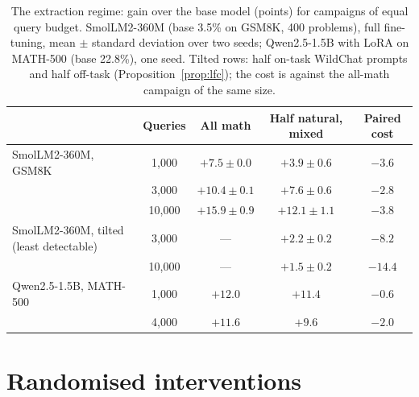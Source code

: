 \begin{table}[h]
\centering
\caption{The extraction regime: gain over the base model (points) for campaigns of equal query budget. SmolLM2-360M (base 3.5\% on GSM8K, 400 problems), full fine-tuning, mean $\pm$ standard deviation over two seeds; Qwen2.5-1.5B with LoRA on MATH-500 (base 22.8\%), one seed. Tilted rows: half on-task WildChat prompts and half off-task (Proposition~\ref{prop:lfc}); the cost is against the all-math campaign of the same size.}
\label{tabA:extract}
\small
\begin{tabular}{lcccc}
\toprule
& Queries & All math & Half natural, mixed & Paired cost \\
\midrule
SmolLM2-360M, GSM8K & 1{,}000 & $+7.5\pm0.0$ & $+3.9\pm0.6$ & $-3.6$ \\
 & 3{,}000 & $+10.4\pm0.1$ & $+7.6\pm0.6$ & $-2.8$ \\
 & 10{,}000 & $+15.9\pm0.9$ & $+12.1\pm1.1$ & $-3.8$ \\
\midrule
SmolLM2-360M, tilted (least detectable) & 3{,}000 & --- & $+2.2\pm0.2$ & $-8.2$ \\
 & 10{,}000 & --- & $+1.5\pm0.2$ & $-14.4$ \\
\midrule
Qwen2.5-1.5B, MATH-500 & 1{,}000 & $+12.0$ & $+11.4$ & $-0.6$ \\
 & 4{,}000 & $+11.6$ & $+9.6$ & $-2.0$ \\
\bottomrule
\end{tabular}
\end{table}




\section{Randomised interventions}
\label{app:randomized}

